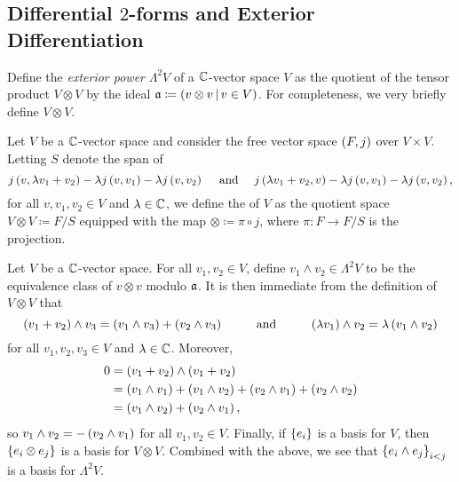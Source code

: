 \documentclass[../Moduli_Spaces_of_Riemann_Surfaces.tex]{subfiles}
\begin{document}
    \subsection{Differential $2$-forms and Exterior Differentiation}
    Define the \textit{exterior power} $\Lambda^2V$ of a $\mathbb{C}$-vector space $V$ as the quotient of the tensor product $V\otimes V$ by the ideal $\mathfrak{a}\coloneqq\left(v\otimes v\,\middle\vert\, v\in V\right)$. For completeness, we very briefly define $V\otimes V$.
    \begin{definition}
        Let $V$ be a $\mathbb{C}$-vector space and consider the free vector space $\left(F,j\right)$ over $V\times V$. Letting $S$ denote the span of
        \begin{equation*}
            j\l(v,\lambda v_1+v_2\r)-\lambda j\l(v,v_1\r)-\lambda j\l(v,v_2\r)\ \ \ \ \textrm{and}\ \ \ \ j\l(\lambda v_1+v_2,v\r)-\lambda j\l(v,v_1\r)-\lambda j\l(v,v_2\r),
        \end{equation*}
        for all $v,v_1,v_2\in V$ and $\lambda\in\mathbb{C}$, we define the  of $V$ as the quotient space $V\otimes V\coloneqq F/S$ equipped with the map $\otimes\coloneqq\pi\circ j$, where $\pi:F\to F/S$ is the projection.
    \end{definition}
    \vspace{-0.05in}
    \begin{remark}
        Let $V$ be a $\mathbb{C}$-vector space. For all $v_1,v_2\in V$, define $v_1\wedge v_2\in\Lambda^2V$ to be the equivalence class of $v\otimes v$ modulo $\mathfrak{a}$. It is then immediate from the definition of $V\otimes V$ that
        \begin{equation*}
            \l(v_1+v_2\r)\wedge v_3=\l(v_1\wedge v_3\r)+\l(v_2\wedge v_3\r)\ \ \ \ \ \ \ \ \textrm{and}\ \ \ \ \ \ \ \ \l(\lambda v_1\r)\wedge v_2=\lambda\l(v_1\wedge v_2\r)
        \end{equation*}
        for all $v_1,v_2,v_3\in V$ and $\lambda\in\mathbb{C}$. Moreover,
        \begin{equation*}
            \begin{aligned}
                0&=\left(v_1+v_2\right)\wedge\left(v_1+v_2\right) \\
                 &=\left(v_1\wedge v_1\right)+\left(v_1\wedge v_2\right)+\left(v_2\wedge v_1\right)+\left(v_2\wedge v_2\right) \\
                 &=\left(v_1\wedge v_2\right)+\left(v_2\wedge v_1\right),
            \end{aligned}
        \end{equation*}
        so $v_1\wedge v_2=-\left(v_2\wedge v_1\right)$ for all $v_1,v_2\in V$. Finally, if $\left\{e_i\right\}$ is a basis for $V$, then $\left\{e_i\otimes e_j\right\}$ is a basis for $V\otimes V$. Combined with the above, we see that $\left\{e_i\wedge e_j\right\}_{i<j}$ is a basis for $\Lambda^2V$.\exqed
    \end{remark}
\end{document}
